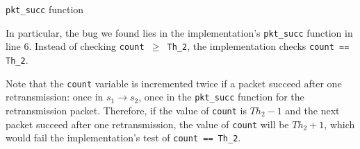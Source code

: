 \begin{algorithm}[t!]
  \caption{\texttt{pkt\_succ} function}
  \label{alg:pkt_succ}
  \begin{algorithmic}[1]
    \EndIf
    \EndFunction
  \end{algorithmic}
\end{algorithm}

In particular, the bug we found lies in the implementation's \texttt{pkt\_succ}
function in line 6. Instead of checking \texttt{count $\ge$ Th\_2}, the
implementation checks \texttt{count == Th\_2}.

Note that the \texttt{count} variable is incremented twice if a packet succeed
after one retransmission: once in $s_1\rightarrow s_2$, once in the
\texttt{pkt\_succ} function for the retransmission packet. Therefore, if the
value of \texttt{count} is $Th_2-1$ and the next packet succeed after one
retransmission, the value of \texttt{count} will be $Th_2+1$, which would fail
the implementation's test of \texttt{count == Th\_2}.
